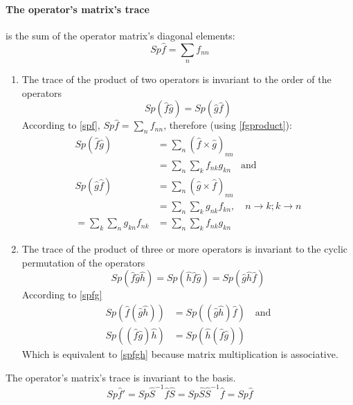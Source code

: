 				\paragraph{The operator's matrix's trace} is the sum of the operator matrix's diagonal elements:
					\begin{equation}
						Sp \hat{f} = \sum_n f_{nn}
						\label{spf}
					\end{equation}
					
					\begin{enumerate}
						\item The trace of the product of two operators is invariant to the order of the operators 
							\begin{equation}
								Sp (\hat{f} \hat{g}) = Sp (\hat{g} \hat{f})
								\label{spfg}
							\end{equation}
							According to \ref{spf}, $Sp \hat{f} = \sum_n f_{nn}$, therefore (using \ref{fgproduct}):
							\begin{align}
								Sp (\hat{f}\hat{g}) &= \sum_n (\hat{f}\times \hat{g})_{nn} \nonumber \\	
								&= \sum_n \sum_k f_{nk} g_{kn} \quad\text{and}\\
								Sp (\hat{g}\hat{f}) &= \sum_n (\hat{g}\times \hat{f})_{nn} \nonumber \\	
								&= \sum_n \sum_k g_{nk} f_{kn}, \quad n\rightarrow k; k\rightarrow n\nonumber \\
								= \sum_k \sum_n g_{kn} f_{nk} &= \sum_n \sum_k f_{nk} g_{kn}
							\end{align}
						\item The trace of the product of three or more operators is invariant to the cyclic permutation of the operators
							\begin{equation}
								Sp (\hat{f} \hat{g} \hat{h}) = Sp (\hat{h} \hat{f} \hat{g}) = Sp (\hat{g} \hat{h} \hat{f})
								\label{spfgh}
							\end{equation}
							According to \ref{spfg}
							\begin{align}
								Sp(\hat{f}(\hat{g}\hat{h})) &= Sp((\hat{g}\hat{h})\hat{f}) \quad\text{and} \\
								Sp((\hat{f}\hat{g})\hat{h}) &= Sp(\hat{h}(\hat{f}\hat{g})) 
							\end{align} 
							Which is equivalent to \ref{spfgh} because matrix multiplication is associative.
					\end{enumerate}
	
					The operator's matrix's trace is invariant to the basis.
					\begin{equation}
						Sp \hat{f}' = Sp \hat{S}^{-1}\hat{f}\hat{S}  = Sp \hat{S}\hat{S}^{-1}\hat{f} =  Sp \hat{f} 
					\end{equation}
